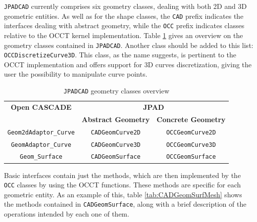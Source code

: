 \lstinline[language=Java]!JPADCAD! currently comprises six geometry classes, dealing with both 2D and 3D geometric entities. As well as for the shape classes, the \lstinline[language=Java]!CAD! prefix indicates the interfaces dealing with abstract geometry, while the \lstinline[language=Java]!OCC! prefix indicates classes relative to the \gls{OCCT} kernel implementation. Table \ref{tab:JPADCADGeomEnt} gives an overview on the geometry classes contained in \lstinline[language=Java]!JPADCAD!. Another class should be added to this list: \lstinline[language=Java]!OCCDiscretizeCurve3D!. This class, as the name suggests, is pertinent to the \gls{OCCT} implementation and offers support for 3D curves discretization, giving the user the possibility to manipulate curve points.
%
\bigskip
\begin{table}[H]
\centering
\begin{tabular}{ccc}
\toprule
\textbf{Open CASCADE} & \multicolumn{2}{c}{\textbf{JPAD}} \\
& \textbf{Abstract Geometry} & \textbf{Concrete Geometry} \\
\midrule
\lstinline[language=Java]!Geom2dAdaptor_Curve! & \lstinline[language=Java]!CADGeomCurve2D! & \lstinline[language=Java]!OCCGeomCurve2D! \\
\lstinline[language=Java]!GeomAdaptor_Curve! & \lstinline[language=Java]!CADGeomCurve3D! & \lstinline[language=Java]!OCCGeomCurve3D! \\
\lstinline[language=Java]!Geom_Surface! & \lstinline[language=Java]!CADGeomSurface! & \lstinline[language=Java]!OCCGeomSurface! \\
\bottomrule
\end{tabular}
\caption{\lstinline[language=Java]!JPADCAD! geometry classes overview}
\label{tab:JPADCADGeomEnt}
\end{table}
%
\noindent
Basic interfaces contain just the methods, which are then implemented by the \lstinline[language=Java]!OCC! classes by using the \gls{OCCT} functions. These methods are specific for each geometric entity. As an example of this, table \ref{tab:CADGeomSurfMesh} shows the methods contained in \lstinline[language=Java]!CADGeomSurface!, along with a brief description of the operations intended by each one of them.
%
\bigskip
\begingroup
